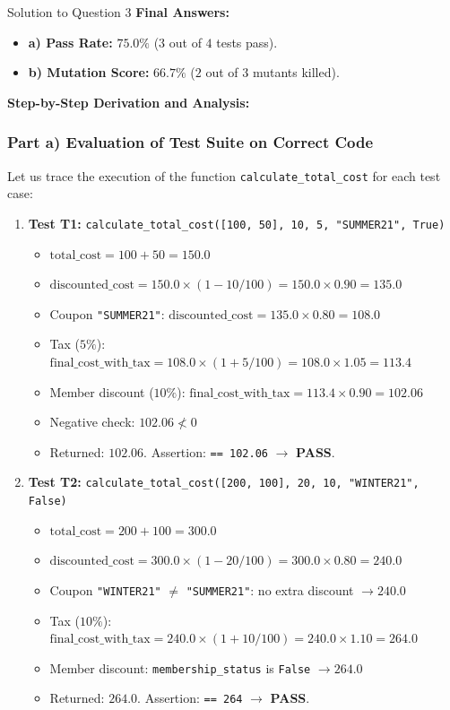 \documentclass[11pt,a4paper]{article}
\begin{document}
\begin{solutionbox}{Solution to Question 3}
\textbf{Final Answers:}
\begin{itemize}
    \item \textbf{a) Pass Rate:} $\mathbf{75.0\%}$ ($3$ out of $4$ tests pass).
    \item \textbf{b) Mutation Score:} $\mathbf{66.7\%}$ ($2$ out of $3$ mutants killed).
\end{itemize}

\medskip
\textbf{Step-by-Step Derivation and Analysis:}

\subsubsection*{Part a) Evaluation of Test Suite on Correct Code}
Let us trace the execution of the function \texttt{calculate\_total\_cost} for each test case:
\begin{enumerate}[label=\textbf{\arabic*.}]
    \item \textbf{Test T1:} \texttt{calculate\_total\_cost([100, 50], 10, 5, "SUMMER21", True)}
    \begin{itemize}
        \item $\text{total\_cost} = 100 + 50 = 150.0$
        \item $\text{discounted\_cost} = 150.0 \times (1 - 10 / 100) = 150.0 \times 0.90 = 135.0$
        \item Coupon \texttt{"SUMMER21"}: $\text{discounted\_cost} = 135.0 \times 0.80 = 108.0$
        \item Tax ($5\%$): $\text{final\_cost\_with\_tax} = 108.0 \times (1 + 5 / 100) = 108.0 \times 1.05 = 113.4$
        \item Member discount ($10\%$): $\text{final\_cost\_with\_tax} = 113.4 \times 0.90 = 102.06$
        \item Negative check: $102.06 \not< 0$
        \item Returned: $102.06$. Assertion: \texttt{== 102.06} $\rightarrow$ \textbf{PASS}.
    \end{itemize}

    \item \textbf{Test T2:} \texttt{calculate\_total\_cost([200, 100], 20, 10, "WINTER21", False)}
    \begin{itemize}
        \item $\text{total\_cost} = 200 + 100 = 300.0$
        \item $\text{discounted\_cost} = 300.0 \times (1 - 20 / 100) = 300.0 \times 0.80 = 240.0$
        \item Coupon \texttt{"WINTER21"} $\neq$ \texttt{"SUMMER21"}: no extra discount $\rightarrow 240.0$
        \item Tax ($10\%$): $\text{final\_cost\_with\_tax} = 240.0 \times (1 + 10 / 100) = 240.0 \times 1.10 = 264.0$
        \item Member discount: \texttt{membership\_status} is \texttt{False} $\rightarrow 264.0$
        \item Returned: $264.0$. Assertion: \texttt{== 264} $\rightarrow$ \textbf{PASS}.
    \end{itemize}


\end{enumerate}
\end{solutionbox}
\end{document}

